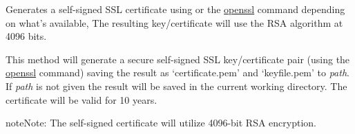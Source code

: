 \documentclass[letterpaper,10pt,openany]{sphinxmanual}
\begin{document}

\begin{fulllineitems}
\label{Developer/utils:gateone.core.utils.gen_self_signed_ssl}
Generates a self-signed SSL certificate using  or the
\href{http://www.openssl.org/docs/apps/openssl.html}{openssl} command
depending on what's available,  The resulting key/certificate will use the
RSA algorithm at 4096 bits.

\end{fulllineitems}


\begin{fulllineitems}
\label{Developer/utils:gateone.core.utils.gen_self_signed_openssl}
This method will generate a secure self-signed SSL key/certificate pair
(using the \href{http://www.openssl.org/docs/apps/openssl.html}{openssl}
command) saving the result as `certificate.pem' and `keyfile.pem' to \emph{path}.
If \emph{path} is not given the result will be saved in the current working
directory.  The certificate will be valid for 10 years.

\begin{notice}{note}{Note:}
The self-signed certificate will utilize 4096-bit RSA encryption.
\end{notice}

\end{fulllineitems}

\end{document}
